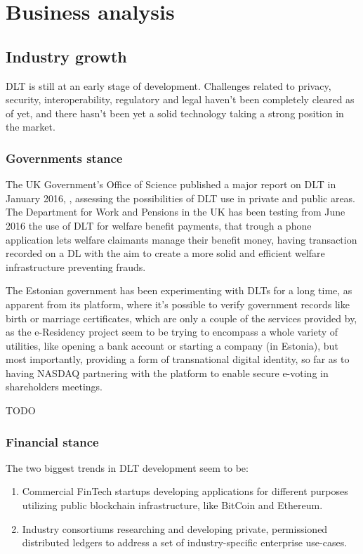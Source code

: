 \chapter{Business analysis}
\label{chap:business-analysis}

\section{Industry growth}

DLT is still at an early stage of development. Challenges related to privacy, security, interoperability, regulatory and legal haven't been completely cleared as of yet, and there hasn't been yet a solid technology taking a strong position in the market.

\subsection{Governments stance}

The UK Government's Office of Science published a major report on DLT in January 2016, \cite{ukgovdltpaper}, assessing the possibilities of DLT use in private and public areas. The Department for Work and Pensions in the UK has been testing from June 2016 the use of DLT for welfare benefit payments, that trough a phone application lets welfare claimants manage their benefit money, having transaction recorded on a DL with the aim to create a more solid and efficient welfare infrastructure preventing frauds.

The Estonian government has been experimenting with DLTs for a long time, as apparent from its \cite{eresidency} platform, where it's possible to verify government records like birth or marriage certificates, which are only a couple of the services provided by, as the e-Residency project seem to be trying to encompass a whole variety of utilities, like opening a bank account or starting a company (in Estonia), but most importantly, providing a form of transnational digital identity, so far as to having NASDAQ partnering with the platform to enable secure e-voting in shareholders meetings.

TODO\\

\subsection{Financial stance}

The two biggest trends in DLT development seem to be:
\begin{enumerate}
    \item Commercial FinTech startups developing applications for different purposes utilizing public blockchain infrastructure, like BitCoin and Ethereum.
    \item Industry consortiums researching and developing private, permissioned distributed ledgers to address a set of industry-specific enterprise use-cases.
\end{enumerate}


